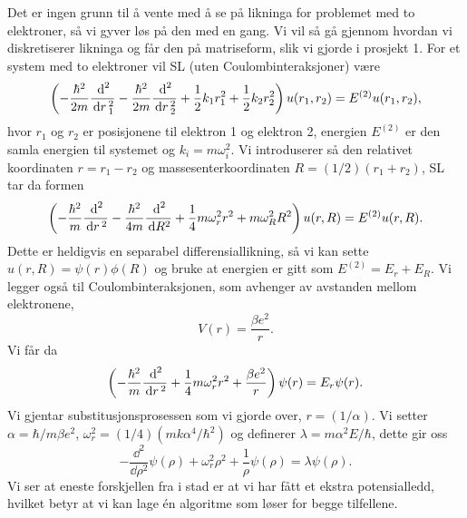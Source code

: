 \documentclass[norsk, 11pt]{article}
\begin{document}
Det er ingen grunn til å vente med å se på likninga for problemet med to elektroner, så vi gyver løs på den med en gang. Vi vil så gå gjennom hvordan vi diskretiserer likninga og får den på matriseform, slik vi gjorde i prosjekt 1. For et system med to elektroner vil SL (uten Coulombinteraksjoner) være
$$ \left( - \frac{ \hbar^2}{2m} \frac{\, {\text d}^2}{\, {\rm d}r\,_1^2} - \frac{ \hbar^2}{2m} \frac{\, {\text d}^2}{\, {\rm d}r\,_2^2} + \frac{1}2 k_1r_1^2 + \frac{1}2 k_2r_2^2 \right) u(r_1,r_2) = E^{(2)}u(r_1,r_2), $$
hvor $r_1$ og $r_2$ er posisjonene til elektron 1 og elektron 2, energien $E^{(2)}$ er den samla energien til systemet og $k_i = m\omega_i^2$. Vi introduserer så den relativet koordinaten $r = r_1 - r_2$ og massesenterkoordinaten $R = (1/2)(r_1 + r_2)$, SL tar da formen
$$ \left( - \frac{ \hbar^2}{m} \frac{\, {\text d}^2}{\, {\rm d}r\,^2} - \frac{ \hbar^2}{4m} \frac{\, {\text d}^2}{\, {\text d} R^2} + \frac{1}4 m\omega_r^2r^2 + m\omega_R^2R^2 \right) u(r,R) = E^{(2)}u(r,R). $$
Dette er heldigvis en separabel differensiallikning, så vi kan sette $u(r,R) = \psi(r)\phi(R)$ og bruke at energien er gitt som $E^{(2)} = E_r + E_R$. Vi legger også til Coulombinteraksjonen, som avhenger av avstanden mellom elektronene,
$$ V(r) = \frac{\beta e^2}r. $$ 
Vi får da
$$ \left( - \frac{ \hbar^2}{m} \frac{\, {\text d}^2}{\, {\rm d}r\,^2} + \frac{1}4 m\omega_r^2r^2 + \frac{\beta e^2}r \right) \psi(r) = E_r\psi(r). $$
Vi gjentar substitusjonsprosessen som vi gjorde over, $r = (1/\alpha)$. Vi setter $\alpha  = \hbar / m\beta e^2$, $\omega_r^2 = (1/4)(mk\alpha^4/\hbar^2)$ og definerer $ \lambda = m \alpha^2 E/\hbar$, dette gir oss
$$ - \frac{\dd^2}{\dd \rho^2} \psi(\rho) + \omega_r^2\rho^2 + \frac{1}\rho  \psi(\rho) = \lambda \psi(\rho). $$
Vi ser at eneste forskjellen fra i stad er at vi har fått et ekstra potensialledd, hvilket betyr at vi kan lage én algoritme som løser for begge tilfellene.
\end{document}

